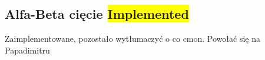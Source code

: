 \subsection{Alfa-Beta cięcie \colorbox{yellow}{Implemented}}
\label{subsec:alfa-beta-ciecie}

{
    \color{red}
    \large Zaimplementowane, pozostało wytłumaczyć o co cmon.
Powołać się na Papadimitru
}